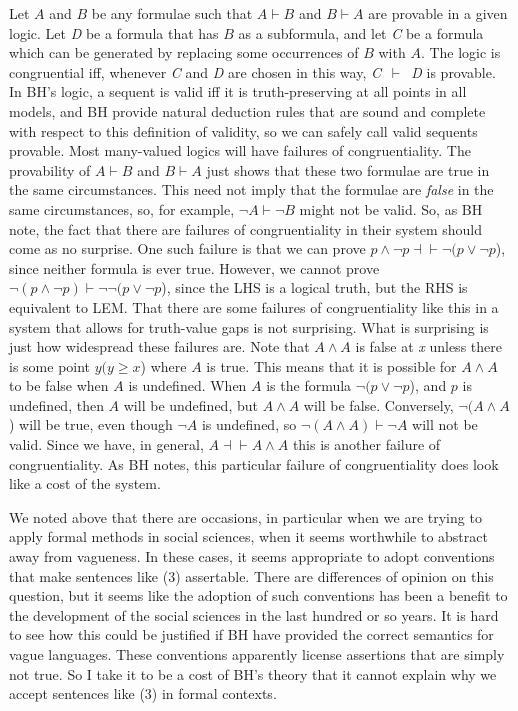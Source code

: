 Let \(A\) and \(B\) be any formulae such that \(A \vdash B\) and \(B \vdash A\) are provable in a given logic. Let \textit{D }be a formula that has \(B\) as a subformula, and let \textit{C} be a formula  which can be generated by replacing some occurrences of \(B\) with \(A\). The logic is congruential iff, whenever \textit{C} and \textit{D} are chosen in this way, \textit{C}~\(\vdash\)~\textit{D} is provable. In BH's logic, a sequent is valid iff it is truth-preserving at all points in all models, and BH provide natural deduction rules that are sound and complete with respect to this definition of validity, so we can safely call valid sequents provable. Most many-valued logics will have failures of congruentiality. The provability of \(A \vdash B\) and \(B \vdash A\) just shows that these two formulae are true in the same circumstances. This need not imply that the formulae are \textit{false} in the same circumstances, so, for example, \(\neg A \vdash \neg B\) might not be valid. So, as BH note, the fact that there are failures of congruentiality in their system should come as no surprise. One such failure is that we can prove \(p \wedge \neg p \dashv \vdash \neg(p \vee \neg p\)), since neither formula is ever true. However, we cannot prove \(\neg(p \wedge \neg p) \vdash \neg \neg(p \vee \neg p\)), since the LHS is a logical truth, but the RHS is equivalent to LEM. That there are some failures of congruentiality like this in a system that allows for truth-value gaps is not surprising. What is surprising is just how widespread these failures are. Note that \(A \wedge A\) is false at\textit{ x} unless there is some point \(y (y \geq x\)) where \(A\) is true. This means that it is possible for \(A \wedge A\) to be false when \(A\) is undefined. When \(A\) is the formula \(\neg(p \vee \neg p\)), and \(p\) is undefined, then \(A\) will be undefined, but \(A \wedge A\) will be false. Conversely, \(\neg(A \wedge A\)) will be true, even though \(\neg A\) is undefined, so \(\neg(A \wedge A) \vdash \neg A\) will not be valid. Since we have, in general, \(A \dashv \vdash A \wedge A\) this is another failure of congruentiality. As BH notes, this particular failure of congruentiality does look like a cost of the system.

We noted above that there are occasions, in particular when we are trying to apply formal methods in social sciences, when it seems worthwhile to abstract away from vagueness. In these cases, it seems appropriate to adopt conventions that make sentences like (3) assertable. There are differences of opinion on this question, but it seems like the adoption of such conventions has been a benefit to the development of the social sciences in the last hundred or so years. It is hard to see how this could be justified if BH have provided the correct semantics for vague languages. These conventions apparently license assertions that are simply not true. So I take it to be a cost of BH's theory that it cannot explain why we accept sentences like (3) in formal contexts.

